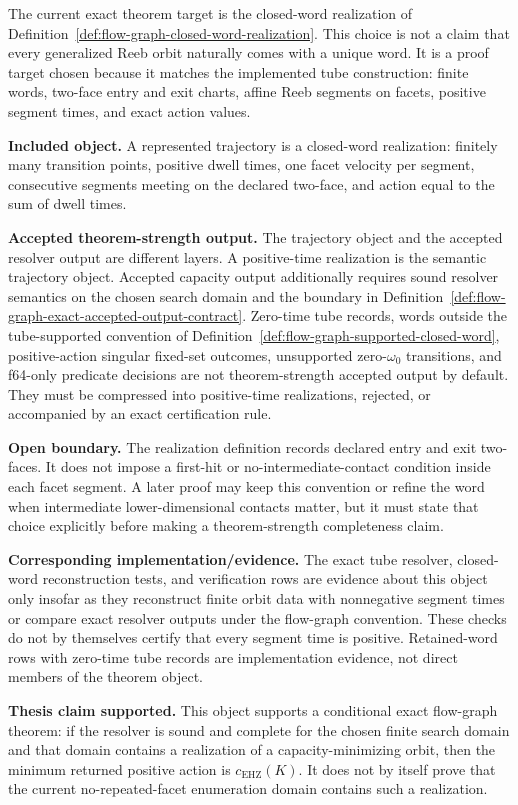 \begin{remark}\label{rem:fg-current-theorem-object}
The current exact theorem target is the closed-word realization of
Definition~\ref{def:flow-graph-closed-word-realization}.  This choice is not a
claim that every generalized Reeb orbit naturally comes with a unique word.  It
is a proof target chosen because it matches the implemented tube construction:
finite words, two-face entry and exit charts, affine Reeb segments on facets,
positive segment times, and exact action values.

\textbf{Included object.}  A represented trajectory is a closed-word
realization: finitely many transition points, positive dwell times, one facet
velocity per segment, consecutive segments meeting on the declared two-face,
and action equal to the sum of dwell times.

\textbf{Accepted theorem-strength output.}  The trajectory object and the
accepted resolver output are different layers.  A positive-time realization is
the semantic trajectory object.  Accepted capacity output additionally requires
sound resolver semantics on the chosen search domain and the boundary in
Definition~\ref{def:flow-graph-exact-accepted-output-contract}.  Zero-time
tube records, words outside the tube-supported convention of
Definition~\ref{def:flow-graph-supported-closed-word}, positive-action
singular fixed-set outcomes, unsupported zero-$\omega_0$ transitions, and
f64-only predicate decisions are not theorem-strength accepted output by
default.  They must be compressed into positive-time realizations, rejected, or
accompanied by an exact certification rule.

\textbf{Open boundary.}  The realization definition records declared entry and
exit two-faces.  It does not impose a first-hit or no-intermediate-contact
condition inside each facet segment.  A later proof may keep this convention or
refine the word when intermediate lower-dimensional contacts matter, but it
must state that choice explicitly before making a theorem-strength
completeness claim.

\textbf{Corresponding implementation/evidence.}  The exact tube resolver,
closed-word reconstruction tests, and verification rows are evidence about
this object only insofar as they reconstruct finite orbit data with
nonnegative segment times or compare exact resolver outputs under the
flow-graph convention.  These checks do not by themselves certify that every
segment time is positive.  Retained-word rows with zero-time tube records are
implementation evidence, not direct members of the theorem object.

\textbf{Thesis claim supported.}  This object supports a conditional exact
flow-graph theorem: if the resolver is sound and complete for the chosen
finite search domain and that domain contains a realization of a
capacity-minimizing orbit, then the minimum returned positive action is
$c_{\mathrm{EHZ}}(K)$.  It does not by itself prove that the current
no-repeated-facet enumeration domain contains such a realization.
\end{remark}

